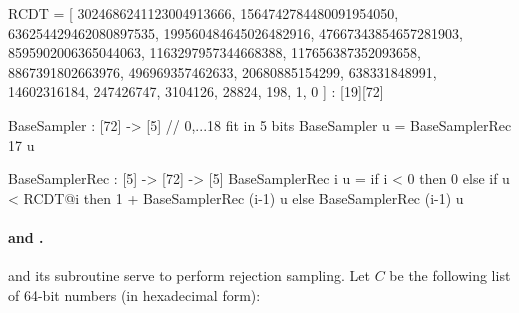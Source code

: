\begin{code}
  RCDT = [
    3024686241123004913666,
    1564742784480091954050,
    636254429462080897535,
    199560484645026482916,
    47667343854657281903,
    8595902006365044063,
    1163297957344668388,
    117656387352093658,
    8867391802663976,
    496969357462633,
    20680885154299,
    638331848991,
    14602316184,
    247426747,
    3104126,
    28824,
    198,
    1,
    0
  ] : [19][72]
\end{code}

\begin{algorithm}[!htb]
	\caption{$\basesampler()$}\label{alg:basesampler}
	\begin{algorithmic}[1]
		\Require {-}
		 
		\label{line:basesampler} 
		 
		\EndFor
	\end{algorithmic}
\end{algorithm}

\begin{code}
  BaseSampler : [72] -> [5] // {0,...18} fit in 5 bits
  BaseSampler u = BaseSamplerRec 17 u

  BaseSamplerRec : [5] -> [72] -> [5]
  BaseSamplerRec i u =
    if i < 0
    then 0
    else
      if u < RCDT@i
      then 1 + BaseSamplerRec (i-1) u
      else BaseSamplerRec (i-1) u
\end{code}

\paragraph{\berexp and \approxexp.} \longberexp and its subroutine \longapproxexp serve to perform rejection sampling. Let $C$ be the following list of 64-bit numbers (in hexadecimal form):

